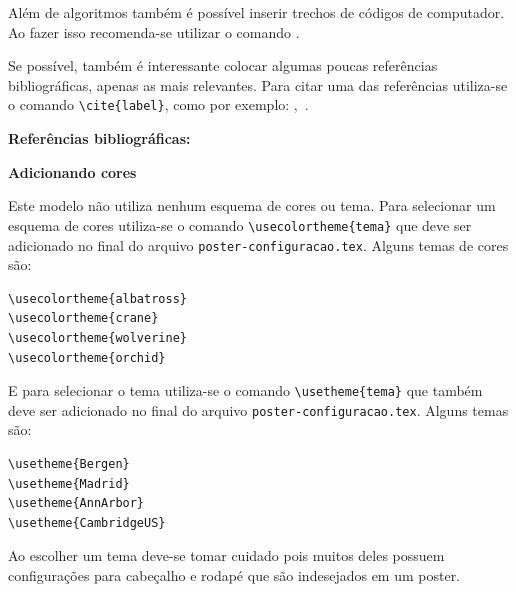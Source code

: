 \documentclass[]{beamer}
\begin{document}
\begin{frame}[t,fragile]
\begin{columns}[t]
\begin{column}{0.4\textwidth}
      Além de algoritmos também é possível inserir trechos de códigos de
      computador. Ao fazer isso recomenda-se utilizar o comando
      \lstinline++.
      

      Se possível, também é interessante colocar algumas poucas referências
      bibliográficas, apenas as mais relevantes. Para citar uma das referências
      utiliza-se o comando \lstinline+\cite{label}+, como por exemplo:
      \cite{Bailey},~\cite{Bay1}.

      \textbf{Referências bibliográficas:}

      
      

      \textbf{Adicionando cores}

      Este modelo não utiliza nenhum esquema de cores ou tema. Para selecionar
      um esquema de cores utiliza-se o comando \lstinline+\usecolortheme{tema}+
      que deve ser adicionado no final do arquivo
      \lstinline+poster-configuracao.tex+. Alguns temas de cores são:
      \begin{lstlisting}
\usecolortheme{albatross}
\usecolortheme{crane}
\usecolortheme{wolverine}
\usecolortheme{orchid}
      \end{lstlisting}
      E para selecionar o tema utiliza-se o comando
      \lstinline+\usetheme{tema}+ que também deve ser adicionado no final do
      arquivo \lstinline+poster-configuracao.tex+. Alguns temas são:
      \begin{lstlisting}
\usetheme{Bergen}
\usetheme{Madrid}
\usetheme{AnnArbor}
\usetheme{CambridgeUS}
      \end{lstlisting}
      Ao escolher um tema deve-se tomar cuidado pois muitos deles possuem
      configurações para cabeçalho e rodapé que são indesejados em um poster.


\end{column}
\end{columns}
\end{frame}
\end{document}
